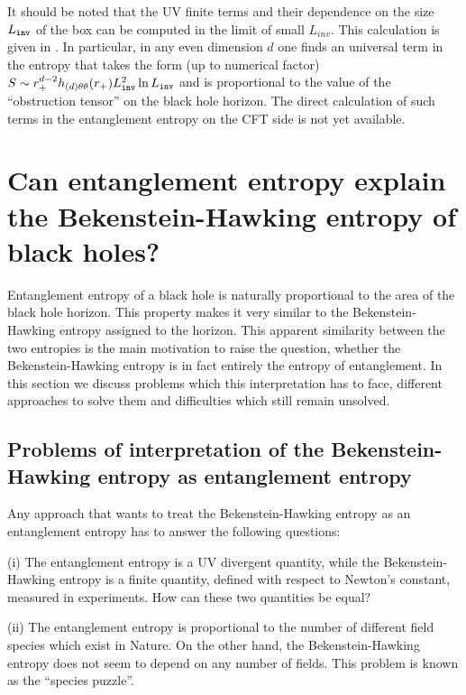 \documentclass[12pt]{article}
\begin{document}
It should be noted that the UV finite terms and their dependence  on the size $L_{\tt inv}$ of the box can be computed in the limit of small $L_{inv}$. This calculation is given in \cite{Solodukhin:2006xv}.  In particular, in any even dimension $d$ one finds an universal
 term in the entropy that takes  the form (up to numerical factor) $S\sim
r_+^{d-2}h_{({d})\theta\theta}(r_+) L^2_{\tt inv}\ln L_{\tt inv}$ and is proportional to the value of the ``obstruction tensor'' on the black hole horizon.
The direct  calculation of such terms in the  entanglement entropy on
the CFT side is not yet available.





\section{Can entanglement entropy explain the Bekenstein-Hawking entropy of black holes?}

Entanglement entropy of a black hole is naturally proportional to the area of the black hole horizon. This property makes it very similar to the
Bekenstein-Hawking entropy assigned to the horizon. This apparent similarity between the two entropies is the main motivation to raise the question, whether
the Bekenstein-Hawking entropy is in fact entirely the entropy of entanglement. In this section we discuss problems which  this interpretation has to face,
different  approaches to solve them and difficulties which still remain unsolved.

\subsection{Problems of interpretation of the Bekenstein-Hawking entropy as entanglement entropy} 

Any approach that wants to treat the Bekenstein-Hawking entropy as an entanglement entropy has to answer the following questions:

\medskip

\noindent (i) The entanglement entropy is a UV divergent quantity, while the Bekenstein-Hawking entropy is a finite quantity, defined with respect to Newton's constant, measured in experiments. How can these two quantities  be equal?

\medskip

\noindent (ii) The entanglement entropy is proportional to the number of different field species which exist in Nature. On the other hand, the Bekenstein-Hawking entropy does not seem to depend 
on any number of fields. This problem is known as the  ``species puzzle''.
\end{document}

